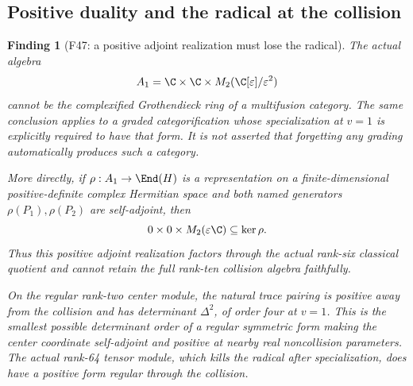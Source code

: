 \documentclass[11pt,a4paper]{article}
\newcommand{\fid}[1]{\textsf{#1}}\newcommand{\gate}[1]{\textsf{#1}}
\theoremstyle{named}\newtheorem{finding}{Finding}[section]
\theoremstyle{definition}\newtheorem{definition}[finding]{Definition}
\theoremstyle{remark}\newtheorem{remark}[finding]{Remark}
\begin{document}
\subsection{Positive duality and the radical at the collision}
\begin{finding}[\fid{F47}: a positive adjoint realization must lose the radical]\label{f:positivecollision}
The actual algebra
\[
 A_1=\C\times\C\times M_2(\C[\varepsilon]/\varepsilon^2)
\]
cannot be the complexified Grothendieck ring of a multifusion
category. The same conclusion applies to a graded categorification
whose specialization at $v=1$ is explicitly required to have that form.
It is not asserted that forgetting any grading automatically produces
such a category.

More directly, if $\rho:A_1\to\End(H)$ is a representation on a
finite-dimensional positive-definite complex Hermitian space and
both named generators $\rho(P_1),\rho(P_2)$ are self-adjoint, then
\[
 0\times0\times M_2(\varepsilon\C)\subseteq\ker\rho.
\]
Thus this positive adjoint realization factors through the actual
rank-six classical quotient and cannot retain the full rank-ten
collision algebra faithfully.

On the regular rank-two center module, the natural trace pairing
is positive away from the collision and has determinant $\Delta^2$,
of order four at $v=1$. This is the smallest possible determinant
order of a regular symmetric form making the center coordinate
self-adjoint and positive at nearby real noncollision parameters.
The actual rank-64 tensor module, which kills the radical after
specialization, does have a positive form regular through the collision.
\end{finding}
\end{document}

